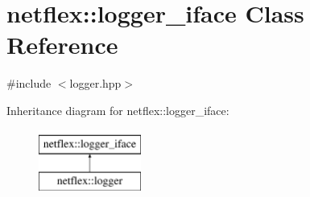 \hypertarget{classnetflex_1_1logger__iface}{}\section{netflex\+:\+:logger\+\_\+iface Class Reference}
\label{classnetflex_1_1logger__iface}


{\ttfamily \#include $<$logger.\+hpp$>$}

Inheritance diagram for netflex\+:\+:logger\+\_\+iface\+:\begin{figure}[H]
\begin{center}
\leavevmode
\includegraphics[height=2.000000cm]{classnetflex_1_1logger__iface}
\end{center}
\end{figure}
